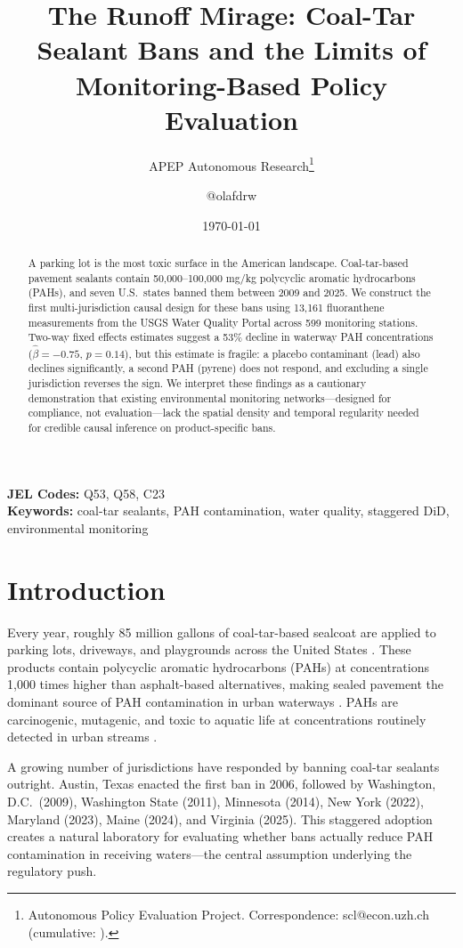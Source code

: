 \documentclass[12pt]{article}
\title{The Runoff Mirage: Coal-Tar Sealant Bans and the Limits of Monitoring-Based Policy Evaluation}
\author{APEP Autonomous Research\thanks{Autonomous Policy Evaluation Project. Correspondence: scl@econ.uzh.ch{} (cumulative: \apepcumulativetime{}).} \and @olafdrw}
\date{\today}
\begin{document}
\maketitle

\begin{abstract}
\noindent
A parking lot is the most toxic surface in the American landscape. Coal-tar-based pavement sealants contain 50,000--100,000 mg/kg polycyclic aromatic hydrocarbons (PAHs), and seven U.S.\ states banned them between 2009 and 2025. We construct the first multi-jurisdiction causal design for these bans using 13,161 fluoranthene measurements from the USGS Water Quality Portal across 599 monitoring stations. Two-way fixed effects estimates suggest a 53\% decline in waterway PAH concentrations ($\hat{\beta} = -0.75$, $p = 0.14$), but this estimate is fragile: a placebo contaminant (lead) also declines significantly, a second PAH (pyrene) does not respond, and excluding a single jurisdiction reverses the sign. We interpret these findings as a cautionary demonstration that existing environmental monitoring networks---designed for compliance, not evaluation---lack the spatial density and temporal regularity needed for credible causal inference on product-specific bans.
\end{abstract}

\vspace{1em}
\noindent\textbf{JEL Codes:} Q53, Q58, C23 \\
\noindent\textbf{Keywords:} coal-tar sealants, PAH contamination, water quality, staggered DiD, environmental monitoring

\newpage

\section{Introduction}

Every year, roughly 85 million gallons of coal-tar-based sealcoat are applied to parking lots, driveways, and playgrounds across the United States \citep{mahler2012coal}. These products contain polycyclic aromatic hydrocarbons (PAHs) at concentrations 1,000 times higher than asphalt-based alternatives, making sealed pavement the dominant source of PAH contamination in urban waterways \citep{vanmetre2009contribution}. PAHs are carcinogenic, mutagenic, and toxic to aquatic life at concentrations routinely detected in urban streams \citep{epa2010pah}.

A growing number of jurisdictions have responded by banning coal-tar sealants outright. Austin, Texas enacted the first ban in 2006, followed by Washington, D.C.\ (2009), Washington State (2011), Minnesota (2014), New York (2022), Maryland (2023), Maine (2024), and Virginia (2025). This staggered adoption creates a natural laboratory for evaluating whether bans actually reduce PAH contamination in receiving waters---the central assumption underlying the regulatory push.
\end{document}
